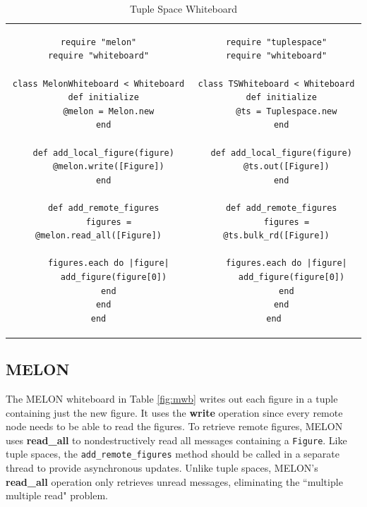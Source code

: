 \documentclass{llncs}
\begin{document}
\begin{table}
\centering
\begin{tabular}{c c}
\begin{minipage}{2.75in}
\begin{verbatim}
require "melon"
require "whiteboard"

class MelonWhiteboard < Whiteboard
  def initialize
    @melon = Melon.new
  end
  
  def add_local_figure(figure)
    @melon.write([Figure])
  end

  def add_remote_figures
    figures = @melon.read_all([Figure])

    figures.each do |figure|
      add_figure(figure[0])
    end
  end
end
\end{verbatim}
\caption{MELON Whiteboard}\label{fig:mwb}
\end{minipage}
&
\begin{minipage}{2.5in}
\begin{verbatim}
require "tuplespace"
require "whiteboard"

class TSWhiteboard < Whiteboard
  def initialize
    @ts = Tuplespace.new
  end

  def add_local_figure(figure)
    @ts.out([Figure])
  end

  def add_remote_figures
    figures = @ts.bulk_rd([Figure])

    figures.each do |figure|
      add_figure(figure[0])
    end
  end
end	
\end{verbatim}
\caption{Tuple Space Whiteboard}\label{fig:tswb}
\end{minipage}
\end{tabular}
\end{table}

\subsection{MELON}

The MELON whiteboard in Table \ref{fig:mwb} writes out each figure in a tuple containing just the new figure. It uses the \textbf{write} operation since every remote node needs to be able to read the figures. To retrieve remote figures, MELON uses \textbf{read\_all} to nondestructively read all messages containing a \texttt{Figure}. Like tuple spaces, the \texttt{add\_remote\_figures} method should be called in a separate thread to provide asynchronous updates. Unlike tuple spaces, MELON's \textbf{read\_all} operation only retrieves unread messages, eliminating the ``multiple multiple read" problem.
\end{document}
